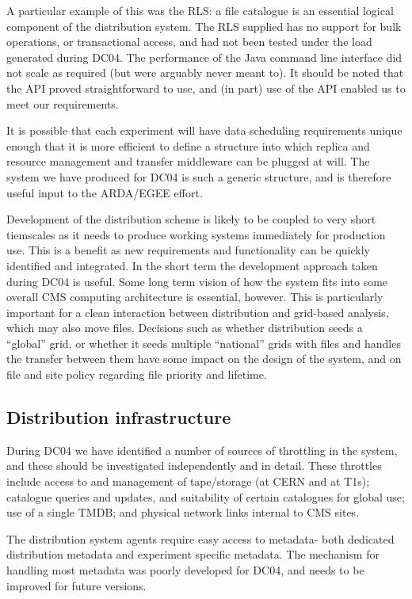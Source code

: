 \documentclass{cmspaper}
\begin{document}
A particular example of this was the RLS: a file catalogue is an
essential logical component of the distribution system. The RLS
supplied has no support for bulk operations, or transactional access,
and had not been tested under the load generated during DC04.  The
performance of the Java command line interface did not scale as
required (but were arguably never meant to). It should be noted that
the API proved straightforward to use, and (in part) use of the API
enabled us to meet our requirements.

It is possible that each experiment will have data scheduling
requirements unique enough that it is more efficient to define a
structure into which replica and resource management and transfer
middleware can be plugged at will. The system we have produced for
DC04 is such a generic structure, and is therefore useful input to the
ARDA/EGEE effort.

Development of the distribution scheme is likely to be coupled to very
short tiemscales as it needs to produce working systems immediately
for production use. This is a benefit as new requirements and
functionality can be quickly identified and integrated. In the short
term the development approach taken during DC04 is useful. Some long
term vision of how the system fits into some overall CMS computing
architecture is essential, however. This is particularly important for
a clean interaction between distribution and grid-based analysis,
which may also move files. Decisions such as whether distribution
seeds a ``global'' grid, or whether it seeds multiple ``national''
grids with files and handles the transfer between them have some
impact on the design of the system, and on file and site policy
regarding file priority and lifetime.

\subsection{Distribution infrastructure}
During DC04 we have identified a number of sources of throttling in
the system, and these should be investigated independently and in
detail. These throttles include access to and management of
tape/storage (at CERN and at T1s); catalogue queries and updates, and
suitability of certain catalogues for global use; use of a single
TMDB; and physical network links internal to CMS sites.

The distribution system agents require easy access to metadata- both
dedicated distribution metadata and experiment specific metadata. The
mechanism for handling most metadata was poorly developed for DC04,
and needs to be improved for future versions.
\end{document}
